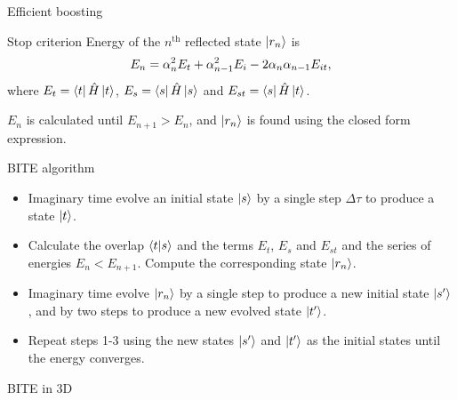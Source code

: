 \documentclass[final,hyperref={pdfpagelabels=false},mathserif]{beamer}
\begin{document}
\begin{columns}[t]
\begin{column}{40cm}
\begin{block}{Efficient boosting}

\end{block}




\begin{block}{Stop criterion}
Energy of the $n^\mathrm{th}$ reflected state $\ket{r_n}$ is
\begin{equation}
\begin{split}
    E_n = \alpha_n^2 E_t + \alpha_{n-1}^2E_i - 2\alpha_n\alpha_{n-1}E_{it},
\end{split}
\notag
\end{equation}
where $E_t = \bra{t}\hat{H}\ket{t}$, $E_s = \bra{s}\hat{H}\ket{s}$ and $E_{st} = \bra{s}\hat{H}\ket{t}$.
\vskip 10pt

$E_n$ is calculated until $E_{n+1} > E_n$, and $\ket{r_n}$ is found using the closed form expression.

\end{block}

\begin{block}{BITE algorithm}

\begin{itemize}[label=\textbullet, leftmargin=*]
    \item Imaginary time evolve an initial state $\ket{s}$ by a single step $\Delta\tau$ to produce a state $\ket{t}$.
    \item Calculate the overlap $\braket{t}{s}$ and the terms $E_t$, $E_s$ and $E_{st}$ and the series of energies $E_n < E_{n+1}$. Compute the corresponding state $\ket{r_n}$.
    \item Imaginary time evolve $\ket{r_n}$ by a single step to produce a new initial state $\ket{s'}$, and by two steps to produce a new evolved state $\ket{t'}$.
    \item Repeat steps 1-3 using the new states $\ket{s'}$ and $\ket{t'}$ as the initial states until the energy converges.
\end{itemize}

\end{block}

   \begin{block}
{BITE in 3D}


\end{block}
\end{column}
\end{columns}
\end{document}
